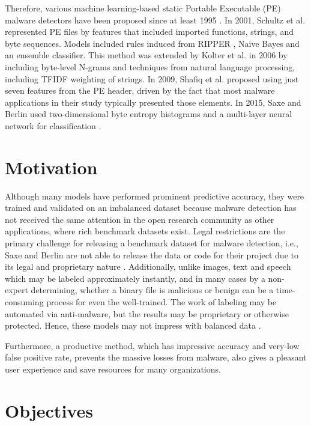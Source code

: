Therefore, various machine learning-based static Portable Executable (PE) malware detectors have been proposed since at least 1995 \cite{kephart1995biologically,schultz2001data,kolter2006learning,Shafiq2009AFF,saxe2015deep}.
In 2001, Schultz et al. \cite{schultz2001data} represented PE files by features that included imported functions, strings, and byte sequences. 
Models included rules induced from RIPPER \cite{cohen1995fast}, Naive Bayes and an ensemble classifier. 
This method was extended by Kolter et al. in 2006 \cite{kolter2006learning} by including byte-level N-grams and techniques from natural language processing, including TFIDF weighting of strings. 
In 2009, Shafiq et al. \cite{Shafiq2009AFF} proposed using just seven features from the PE header, driven by the fact that most malware applications in their study typically presented those elements. 
In 2015, Saxe and Berlin used two-dimensional byte entropy histograms and a multi-layer neural network for classification \cite{saxe2015deep}.

\section{Motivation}
\label{sec:motivation}

Although many models have performed prominent predictive accuracy, they were trained and validated on an imbalanced dataset because malware detection has not received the same attention in the open research community as other applications, where rich benchmark datasets exist. 
Legal restrictions are the primary challenge for releasing a benchmark dataset for malware detection, i.e., Saxe and Berlin are not able to release the data or code for their project due to its legal and proprietary nature \cite{saxe2015deep}. 
Additionally, unlike images, text and speech which may be labeled approximately instantly, and in many cases by a non-expert determining, whether a binary file is malicious or benign can be a time-consuming process for even the well-trained. 
The work of labeling may be automated via anti-malware, but the results may be proprietary or otherwise protected. Hence, these models may not impress with balanced data \cite{chawla2009data}.

Furthermore, a productive method, which has impressive accuracy and very-low false positive rate, prevents the massive losses from malware, also gives a pleasant user experience and save resources for many organizations.

\section{Objectives}
\label{sec:objectives}

